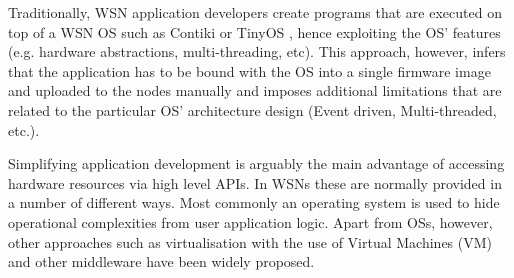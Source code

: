 Traditionally, WSN application developers create programs that are executed on top of a WSN OS such as Contiki \cite{1367266} or TinyOS \cite{1630599}, hence exploiting the OS' features (e.g. hardware abstractions, multi-threading, etc). This approach, however, infers that the application has to be bound with the OS into a single firmware image and uploaded to the nodes manually and imposes additional limitations that are related to the particular OS' architecture design (Event driven, Multi-threaded, etc.).

Simplifying application development is arguably the main advantage of accessing hardware resources via high level APIs. In WSNs these are normally provided in a number of different ways. Most commonly an operating system is used to hide operational complexities from user application logic. Apart from OSs, however, other approaches such as virtualisation with the use of Virtual Machines (VM) \cite{Levis:2002:MTV:635506.605407,simon2005squawk,hong2009tinyvm,4300022} and other middleware \cite{Fok:2009:AMA:1552297.1552299,1621014,6529470,6671886} have been widely proposed.

